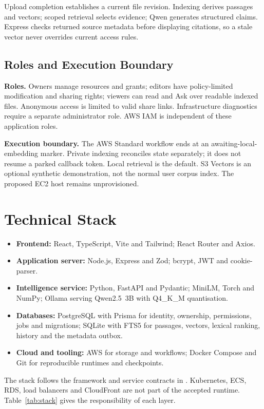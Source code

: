 Upload completion establishes a current file revision. Indexing derives passages and vectors; scoped retrieval selects evidence; Qwen generates structured claims. Express checks returned source metadata before displaying citations, so a stale vector never overrides current access rules.

\subsection{Roles and Execution Boundary}

\textbf{Roles.} Owners manage resources and grants; editors have policy-limited modification and sharing rights; viewers can read and Ask over readable indexed files. Anonymous access is limited to valid share links. Infrastructure diagnostics require a separate administrator role. AWS IAM is independent of these application roles.

\textbf{Execution boundary.} The AWS Standard workflow ends at an awaiting-local-embedding marker. Private indexing reconciles state separately; it does not resume a parked callback token. Local retrieval is the default. S3 Vectors is an optional synthetic demonstration, not the normal user corpus index. The proposed EC2 host remains unprovisioned.

\section{Technical Stack}

\begin{itemize}
  \item \textbf{Frontend:} React, TypeScript, Vite and Tailwind; React Router and Axios.
  \item \textbf{Application server:} Node.js, Express and Zod; bcrypt, JWT and cookie-parser.
  \item \textbf{Intelligence service:} Python, FastAPI and Pydantic; MiniLM, Torch and NumPy; Ollama serving Qwen2.5~3B with Q4\_K\_M quantisation.
  \item \textbf{Databases:} PostgreSQL with Prisma for identity, ownership, permissions, jobs and migrations; SQLite with FTS5 for passages, vectors, lexical ranking, history and the metadata outbox.
  \item \textbf{Cloud and tooling:} AWS for storage and workflows; Docker Compose and Git for reproducible runtimes and checkpoints.
\end{itemize}

The stack follows the framework and service contracts in \cite{AWSCFN,React,Express,FastAPI,Prisma,PGDG16,SQLiteFTS5}. Kubernetes, ECS, RDS, load balancers and CloudFront are not part of the accepted runtime. Table~\ref{tab:stack} gives the responsibility of each layer.

